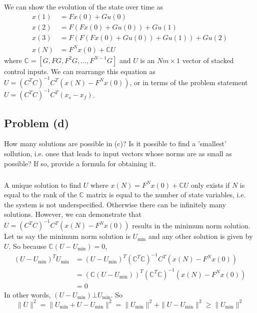 \documentclass[11pt]{article}
\begin{document}
\subparagraph*{}
We can show the evolution of the state over time as
\begin{align*}
	x(1) &= Fx(0) + Gu(0) \\
	x(2) &= F(Fx(0)+Gu(0)) + Gu(1) \\
	x(3) &= F(F(Fx(0)+Gu(0))+Gu(1)) + Gu(2) \\
	x(N) &= F^Nx(0) + \mathbb{C}U
\end{align*}
where $\mathbb{C}=[G,FG,F^2G,\dots,F^{N-1}G]$ and $U$ is an $Nm\times1$ vector of stacked control inputs. We can rearrange this equation as $U=(C^TC)^{-1}C^T(x(N)-F^Nx(0))$, or in terms of the problem statement $U=(C^TC)^{-1}C^T(x_s-x_f)$. 

\subsection*{Problem (d)}
How many solutions are possible in (c)? Is it possible to find a 'smallest' sollution, i.e. onee that leads to input vectors whose norms are as small as possible? If so, provide a formula for obtaining it.

\subparagraph*{}
A unique solution to find $U$ where $x(N)=F^Nx(0)+\mathbb{C}U$ only exists if $N$ is equal to the rank of the $\mathbb{C}$ matrix is equal to the number of state variables, i.e. the system is not underspecified. Otherwise there can be infinitely many solutions. However, we can demonstrate that $U=(C^TC)^{-1}C^T(x(N)-F^Nx(0))$ results in the minimum norm solution. Let us say the minimum norm solution is $U_\text{min}$ and any other solution is given by $U$. So because $\mathbb{C}(U-U_\text{min})=0$, 
\begin{align*}
	(U-U_\text{min})^TU_\text{min} &= (U-U_\text{min})^T(\mathbb{C}^T\mathbb{C})^{-1}C^T(x(N)-F^Nx(0)) \\
	&= (\mathbb{C}(U-U_\text{min}))^T(\mathbb{C}^T\mathbb{C})^{-1}(x(N)-F^Nx(0)) \\
	&= 0
\end{align*}
In other words, $(U-U_\text{min})\bot U_\text{min}$. So
\begin{equation*}
	\|U\|^2=\|U_\text{min}+U-U_\text{min}\|^2=\|U_\text{min}\|^2+\|U-U_\text{min}\|^2 \geq \|U_\text{min}\|^2
\end{equation*}
\end{document}
